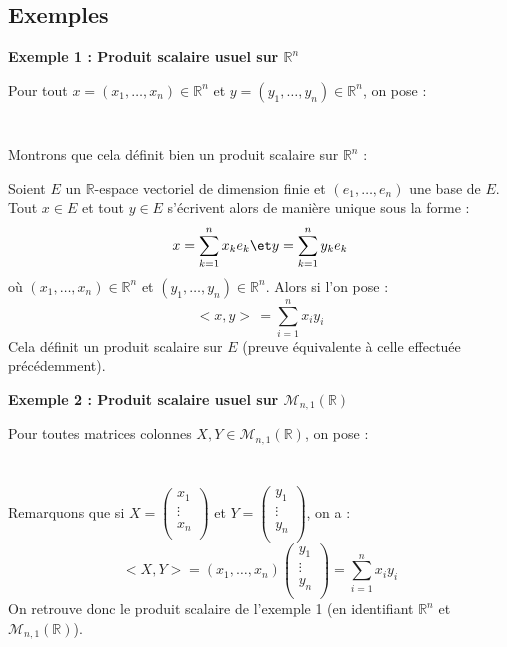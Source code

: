 \documentclass[french,11pt,twoside]{VcCours}
\begin{document}
\subsection{Exemples}

\textbf{Exemple 1 : Produit scalaire usuel sur $\mathbb{R}^n$}

Pour tout $x=(x_1, \ldots, x_n) \in \mathbb{R}^n$ et $y=(y_1, \ldots, y_n) \in \mathbb{R}^n$, on pose :
$$ \phantom{\fbox{$<x,y> \, = \sum_{i=1}^n x_i y_i $}}$$
Montrons que cela définit bien un produit scalaire sur $\mathbb{R}^n$ :

\vspace{6cm}

\newpage



\begin{Remarque}{} Soient $E$ un $\mathbb{R}$-espace vectoriel de dimension finie et $(e_1, \ldots, e_n)$ une base de $E$. Tout $x \in E$ et tout $y \in E$ s'écrivent alors de manière unique sous la forme :
$$ x = \sum_{k=1}^n x_k e_k \et  y = \sum_{k=1}^n y_k e_k$$
où $(x_1, \ldots, x_n) \in \mathbb{R}^n$ et $(y_1, \ldots, y_n) \in \mathbb{R}^n$. Alors si l'on pose :
$$ <x,y> \, = \sum_{i=1}^n x_i y_i$$
Cela définit un produit scalaire sur $E$ (preuve équivalente à celle effectuée précédemment).
\end{Remarque} 
\medskip

\textbf{Exemple 2 : Produit scalaire usuel sur $\mathcal{M}_{n,1}(\mathbb{R})$}

Pour toutes matrices colonnes $X, Y \in \mathcal{M}_{n,1}(\mathbb{R})$, on pose :
$$ \phantom{\fbox{$<X,Y> \, = ~^tX Y $}}$$
Remarquons que si $X = \begin{pmatrix}
x_1 \\
\vdots \\
x_n \\
\end{pmatrix}$ et $Y = \begin{pmatrix}
y_1 \\
\vdots \\
y_n \\
\end{pmatrix}$, on a :
$$ <X,Y> = (x_1, \ldots, x_n) \begin{pmatrix}
y_1 \\
\vdots \\
y_n \\
\end{pmatrix} = \sum_{i=1}^{n} x_i y_i $$
On retrouve donc le produit scalaire de l'exemple 1 (en identifiant $\mathbb{R}^n$ et $\mathcal{M}_{n,1}(\mathbb{R})$).
\end{document}
